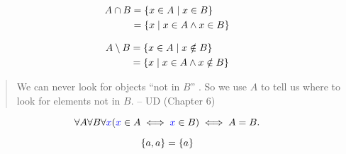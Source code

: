\begin{frame}{}
  \begin{definition}[``$\cap$'']
    \vspace{-0.50cm}
    \begin{align*}
      A \cap B &= \{x \in A \mid x \in B\} \\
	       &= \{x \mid x \in A \land x \in B\}
    \end{align*}
  \end{definition}

  \pause
  \vspace{0.80cm}
  \begin{definition}[``$\setminus$'']
    \vspace{-0.50cm}
    \begin{align*}
      A \setminus B &= \{x \in A \mid x \notin B\} \\
	       &= \{x \mid x \in A \land x \notin B\}
    \end{align*}
  \end{definition}

  \pause
  \vspace{0.30cm}
  \begin{quote}
    We can never look for objects ``not in $B$'' .
    So we use $A$ to tell us where to look for elements not in $B$.
    \hfill -- UD (Chapter 6)
  \end{quote}
\end{frame}

\begin{frame}{}
  \begin{definition}
    \[
      \forall A \forall B \forall \textcolor{blue}{x} (\textcolor{blue}{x} \in A \iff \textcolor{blue}{x} \in B) \iff A = B.
    \]
  \end{definition}

  \pause
  \[
    \{a, a\} = \{a\}
  \]


\end{frame}

% 
% 
% 
% 
